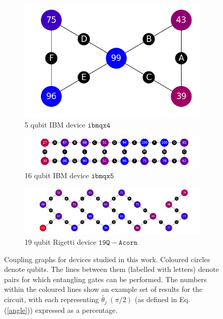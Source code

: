 \documentclass[aps,prl,twocolumn,showpacs,preprintnumbers]{revtex4-1}
\begin{document}
\begin{figure}
    \centering
    \begin{subfigure}[b]{0.5\columnwidth}
        \includegraphics[width=\textwidth]{figures/ibmqx4.png}
        \caption{5 qubit IBM device $\mathtt{ibmqx4}$}
    \end{subfigure}
    \begin{subfigure}[b]{\columnwidth}
        \includegraphics[width=\textwidth]{figures/ibmqx5.png}
        \caption{16 qubit IBM device $\mathtt{ibmqx5}$}
    \end{subfigure}
    \begin{subfigure}[b]{\columnwidth}
        \includegraphics[width=\textwidth]{figures/acorn.png}
        \caption{19 qubit Rigetti device $\mathtt{19Q-Acorn}$}
    \end{subfigure}
    \caption{Coupling graphs for devices studied in this work. Coloured circles denote qubits. The lines between them (labelled with letters) denote pairs for which entangling gates can be performed. The numbers within the coloured lines show an example set of results for the circuit, with each representing $\tilde{\theta_j} \ (\pi/2)$ (as defined in Eq. (\ref{angle})) expressed as a percentage.}\label{fig:graphs}
\end{figure}
\end{document}
